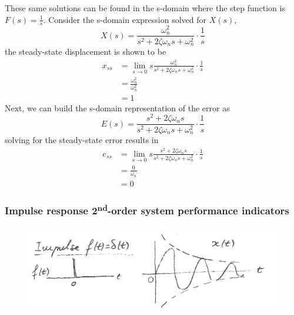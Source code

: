 \documentclass[12pt,letter]{article}
\begin{document}
These same solutions can be found in the s-domain where the step function is $F(s)=\frac{1}{s}$. Consider the s-domain expression solved for $X(s)$, 
\begin{equation}
X(s) = \frac{\omega_n^2}{s^2 + 2 \zeta \omega_n s + \omega_n^2} \cdot \frac{1}{s} 
\end{equation}
the steady-state displacement is shown to be
\begin{align}
x_{ss} &= \lim\limits_{s \rightarrow 0} s \frac{\omega_n^2}{s^2 + 2 \zeta \omega_n s + \omega_n^2} \cdot \frac{1}{s} \\
&= \frac{\omega_n^2}{\omega_n^2}   \nonumber \\
&= 1    \nonumber 
\end{align}
Next, we can build the s-domain representation of the error as
\begin{equation}
E(s) = \frac{s^2 + 2 \zeta \omega_n s}{s^2 + 2 \zeta \omega_n s + \omega_n^2} \cdot \frac{1}{s}
\end{equation}
solving for the steady-state error results in
\begin{align}
e_{ss} &= \lim\limits_{s \rightarrow 0} s  \frac{s^2 + 2 \zeta \omega_n s}{s^2 + 2 \zeta \omega_n s + \omega_n^2} \cdot \frac{1}{s} \\
&= \frac{0}{\omega_n}   \nonumber \\
&= 0   \nonumber 
\end{align}

\subsubsection{Impulse response 2\textsuperscript{nd}-order system performance indicators}

\begin{figure}[H]
	\centering
	\includegraphics[width=6.5in]{../figures/impulse_response_2nd_order_with_steady_state_error}
\end{figure}
\end{document}
